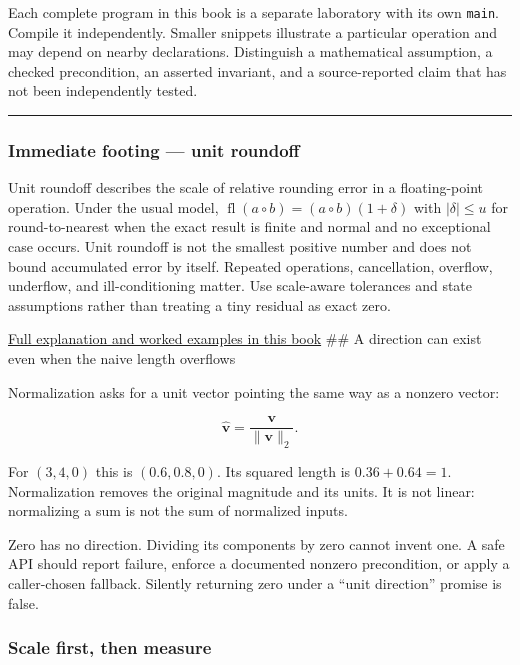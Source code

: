 Each complete program in this book is a separate laboratory with its own \texttt{main}. Compile it independently. Smaller snippets illustrate a particular operation and may depend on nearby declarations. Distinguish a mathematical assumption, a checked precondition, an asserted invariant, and a source-reported claim that has not been independently tested.

\begin{center}\rule{0.5\linewidth}{0.5pt}\end{center}

\subsubsection{Immediate footing --- unit roundoff}\label{01-foundations-i-ch017-immediate-footing-unit-roundoff}

Unit roundoff describes the scale of relative rounding error in a floating-point operation. Under the usual model, \(\operatorname{fl}(a\circ b)=(a\circ b)(1+\delta)\) with \(|\delta|\le u\) for round-to-nearest when the exact result is finite and normal and no exceptional case occurs. Unit roundoff is not the smallest positive number and does not bound accumulated error by itself. Repeated operations, cancellation, overflow, underflow, and ill-conditioning matter. Use scale-aware tolerances and state assumptions rather than treating a tiny residual as exact zero.

\hyperref[02-foundations-ii-ch028-floating-point-answers-error-conditioning-stability-and-stable-arithmetic]{Full explanation and worked examples in this book} \#\# A direction can exist even when the naive length overflows

{Normalization} asks for a unit vector pointing the same way as a nonzero vector:

\[
\widehat{\mathbf v}=\frac{\mathbf v}{\|\mathbf v\|_2}.
\]

For \((3,4,0)\) this is \((0.6,0.8,0)\). Its squared length is \(0.36+0.64=1\). Normalization removes the original magnitude and its units. It is not linear: normalizing a sum is not the sum of normalized inputs.

Zero has no direction. Dividing its components by zero cannot invent one. A safe API should report failure, enforce a documented nonzero precondition, or apply a caller-chosen fallback. Silently returning zero under a ``unit direction'' promise is false.

\subsubsection{Scale first, then measure}\label{01-foundations-i-ch017-scale-first-then-measure}

